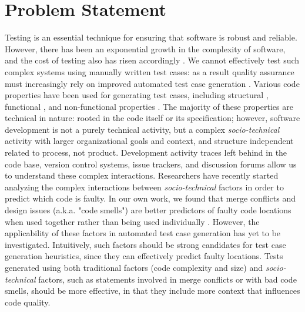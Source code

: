 \documentclass[10pt]{article}
\begin{document}
\section{Problem Statement}
Testing is an essential technique for ensuring that software is robust and reliable. However, there has been an exponential growth in the complexity of software, and the cost of testing also has risen accordingly \cite{myers2011art}. We cannot effectively test such complex systems using manually written test cases: as a result quality assurance must increasingly rely on improved automated test case generation \cite{anand2013orchestrated,harman2012search}. Various code properties have been used for generating test cases, including
structural \cite{tonella2004evolutionary}, functional \cite{wegener2004evaluation}, and non-functional properties \cite{wegener1998verifying}. The majority of these properties are technical in nature:  rooted in the code itself or its specification; however, software development is not a purely technical activity, but a complex \emph{socio-technical} activity with larger organizational goals and context, and structure independent related to process, not product. Development activity traces left behind in the code base, version control systems, issue trackers, and discussion forums allow us to understand these complex interactions. Researchers have recently started analyzing the complex interactions between \emph{socio-technical} factors in order to predict which code is faulty. In our own work, we found that merge conflicts and design issues (a.k.a. "code smells") are better predictors of faulty code locations when used together rather than being used individually \cite{ahmedempirical} . However, the applicability of these factors in automated test case generation has yet to be investigated. Intuitively, such factors should be strong candidates for test case generation heuristics, since they can effectively predict faulty locations. Tests generated using both traditional factors (code complexity and size) and \emph{socio-technical} factors, such as statements involved in merge conflicts or with bad code smells, should be more effective, in that they include more context that influences code quality.

\end{document}

